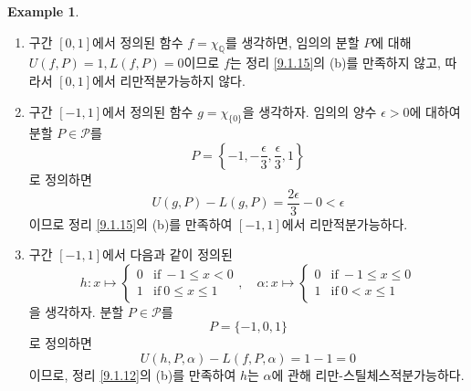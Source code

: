 \documentclass[11pt]{book}
\numberwithin{equation}{chapter}
\def\QQ{\mathbb{Q}}
\def\eps{\epsilon}
\def\calP{\mathcal{P}}
\def\textif{\text{if}}
\theoremstyle{definition}
\newtheorem*{ex}{Example}
\newenvironment{enum}
	{\begin{enumerate}[label=(\alph*), leftmargin=2\parindent]}
	{\end{enumerate}}
\begin{document}
\begin{ex}
    \quad

    \begin{enum}
        \item 구간 \([0, 1]\)에서 정의된 함수 \(f = \chi_{\QQ}\)를 생각하면, 임의의 분할 \(P\)에 대해 \(U(f, P) = 1, L(f, P) = 0\)이므로 \(f\)는 정리 \ref{9.1.15}의 (b)를 만족하지 않고, 따라서 \([0, 1]\)에서 리만적분가능하지 않다.
        \item 구간 \([-1, 1]\)에서 정의된 함수 \(g = \chi_{\{0\}}\)을 생각하자. 임의의 양수 \(\eps > 0\)에 대하여 분할 \(P \in \calP\)를
        \[
            P = \left\{-1, -\frac{\eps}{3}, \frac{\eps}{3}, 1\right\}
        \]
        로 정의하면
        \[
            U(g, P) - L(g, P) = \frac{2\eps}{3} - 0 < \eps
        \]
        이므로 정리 \ref{9.1.15}의 (b)를 만족하여 \([-1, 1]\)에서 리만적분가능하다.
        \item 구간 \([-1, 1]\)에서 다음과 같이 정의된
        \[
            h : x \mapsto
            \begin{cases}
                0 &\textif \ -1 \le x < 0\\
                1 &\textif \ 0 \le x \le 1
            \end{cases}, \quad
            \alpha : x \mapsto
            \begin{cases}
                0 &\textif \ -1 \le x \le 0\\
                1 &\textif \ 0 < x \le 1
            \end{cases}
        \]
        을 생각하자. 분할 \(P \in \calP\)를
        \[
            P = \{-1, 0, 1\}
        \]
        로 정의하면
        \[
            U(h, P, \alpha) - L(f, P, \alpha) = 1 - 1 = 0
        \]
        이므로, 정리 \ref{9.1.12}의 (b)를 만족하여 \(h\)는 \(\alpha\)에 관해 리만-스틸체스적분가능하다.
    \end{enum}
\end{ex}
\end{document}
